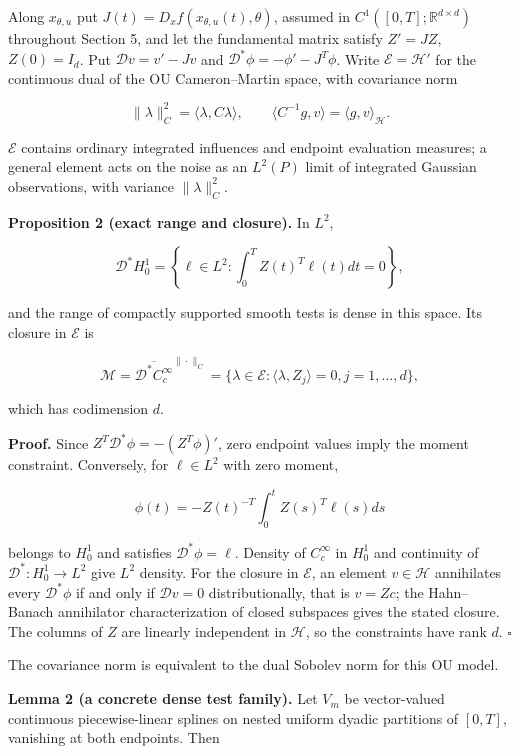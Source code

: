 \documentclass[
  american,
  11pt,
]{article}
\begin{document}
Along \(x_{\theta,u}\) put \(J(t)=D_xf(x_{\theta,u}(t),\theta)\),
assumed in \(C^1([0,T];\mathbb R^{d\times d})\) throughout Section 5,
and let the fundamental matrix satisfy \(Z'=JZ\), \(Z(0)=I_d\). Put
\(\mathcal D v=v'-Jv\) and \(\mathcal D^*\phi=-\phi'-J^T\phi\). Write
\(\mathcal E=\mathcal H'\) for the continuous dual of the OU
Cameron--Martin space, with covariance norm

\[
\|\lambda\|_C^2=\langle\lambda,C\lambda\rangle,
\qquad
\langle C^{-1}g,v\rangle=\langle g,v\rangle_{\mathcal H}.
\]

\(\mathcal E\) contains ordinary integrated influences and endpoint
evaluation measures; a general element acts on the noise as an
\(L^2(P)\) limit of integrated Gaussian observations, with variance
\(\|\lambda\|_C^2\).

\textbf{Proposition 2 (exact range and closure).} In \(L^2\),

\[
\mathcal D^*H_0^1
=\left\{\ell\in L^2:\int_0^T Z(t)^T\ell(t)dt=0\right\},
\]

and the range of compactly supported smooth tests is dense in this
space. Its closure in \(\mathcal E\) is

\[
\mathcal M=\overline{\mathcal D^*C_c^\infty}^{\|\cdot\|_C}
=\{\lambda\in\mathcal E:\langle\lambda,Z_j\rangle=0, j=1,\ldots,d\},
\]

which has codimension \(d\).

\textbf{Proof.} Since \(Z^T\mathcal D^*\phi=-(Z^T\phi)'\), zero endpoint
values imply the moment constraint. Conversely, for \(\ell\in L^2\) with
zero moment,

\[
\phi(t)=-Z(t)^{-T}\int_0^t Z(s)^T\ell(s)ds
\]

belongs to \(H_0^1\) and satisfies \(\mathcal D^*\phi=\ell\). Density of
\(C_c^\infty\) in \(H_0^1\) and continuity of
\(\mathcal D^*:H_0^1\to L^2\) give \(L^2\) density. For the closure in
\(\mathcal E\), an element \(v\in\mathcal H\) annihilates every
\(\mathcal D^*\phi\) if and only if \(\mathcal D v=0\) distributionally,
that is \(v=Zc\); the Hahn--Banach annihilator characterization of
closed subspaces gives the stated closure. The columns of \(Z\) are
linearly independent in \(\mathcal H\), so the constraints have rank
\(d\). \(\square\)

The covariance norm is equivalent to the dual Sobolev norm for this OU
model.

\textbf{Lemma 2 (a concrete dense test family).} Let \(V_m\) be
vector-valued continuous piecewise-linear splines on nested uniform
dyadic partitions of \([0,T]\), vanishing at both endpoints. Then
\end{document}
